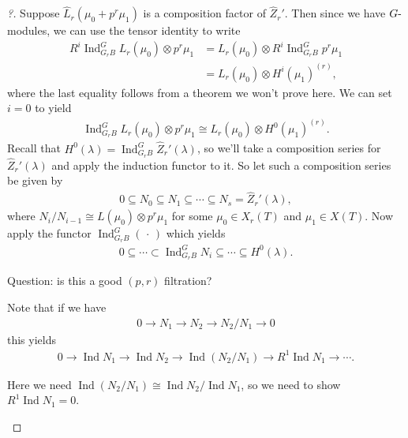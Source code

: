 \begin{proof}[?]

Suppose \(\widehat{L}_r(\mu_0 + p^r\mu_1)\) is a composition factor of
\(\widehat{Z}_r'\). Then since we have \(G{\hbox{-}}\)modules, we can
use the tensor identity to write
\begin{align*}  
R^i \operatorname{Ind}_{G_r B}^{G} L_r(\mu_0) \otimes p^r \mu_1
&= L_r(\mu_0) \otimes R^i \operatorname{Ind}_{G_r B}^{G} p^r \mu_1 \\
&= L_r(\mu_0) \otimes H^i(\mu_1)^{(r)}
,\end{align*}
where the last equality follows from a theorem we won't prove here. We
can set \(i=0\) to yield
\begin{align*}  
\operatorname{Ind}_{G_r B}^{G} L_r(\mu_0) \otimes p^r \mu_1
\cong L_r(\mu_0) \otimes H^0(\mu_1)^{(r)}
.\end{align*}
Recall that
\(H^0(\lambda) = \operatorname{Ind}_{G_r B}^{G} \widehat{Z}_r'(\lambda)\),
so we'll take a composition series for \(\widehat{Z}_r'(\lambda)\) and
apply the induction functor to it. So let such a composition series be
given by
\begin{align*}  
0\subseteq N_0 \subseteq N_1 \subseteq \cdots \subseteq N_s = \widehat{Z}_r'(\lambda)
,\end{align*}
where \(N_i / N_{i-1} \cong L(\mu_0) \otimes p^r \mu_1\) for some
\(\mu_0\in X_r(T)\) and \(\mu_1\in X(T)\). Now apply the functor
\(\operatorname{Ind}_{G_r B}^{G}({\,\cdot\,})\) which yields
\begin{align*}  
0\subseteq \cdots \subset \operatorname{Ind}_{G_r B}^{G} N_i \subseteq \cdots \subseteq H^0(\lambda)
.\end{align*}

Question: is this a good \((p, r)\) filtration?

\begin{warnings}

Note that if we have
\begin{align*}  
0 \to N_1 \to N_2 \to N_2/N_1 \to 0
\end{align*}
this yields
\begin{align*}  
0 \to \operatorname{Ind}N_1 \to \operatorname{Ind}N_2 \to \operatorname{Ind}(N_2/N_1) \to R^1 \operatorname{Ind}N_1 \to \cdots
.\end{align*}

Here we need
\(\operatorname{Ind}(N_2/N_1) \cong \operatorname{Ind}N_2 / \operatorname{Ind}N_1\),
so we need to show \(R^1 \operatorname{Ind}N_1 = 0\).


\end{warnings}
\end{proof}
